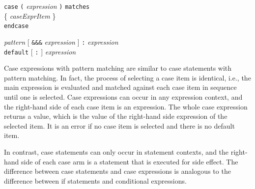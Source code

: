 \documentclass[twoside,letterpaper]{article}
\newcommand{\hm}{\hspace*{1em}}
\newcommand{\hmm}{\hspace*{2em}}
\newcommand{\nterm}[1]{\emph{#1}}
\newcommand{\term}[1]{\texttt{#1}}
\newcommand{\many}[1]{\{ #1 \}}
\newcommand{\opt}[1]{[ #1 ]}
\newcommand{\alt}{{$\mid$}}
\newcommand{\gram}[2]{    \hm\makebox[10em][l]{\it #1}\makebox[1.5em][l]{::=}    #2}
\newcommand{\grammore}[1]{\hm\makebox[10em][l]{      }\makebox[1.5em][l]{}       #1}
\newcommand{\gramalt}[1]{ \hm\makebox[10em][l]{      }\makebox[1.5em][l]{\alt}   #1}
\begin{document}
\label{sec-case-expr}


\gram{caseExpr}{ \term{case} \term{(} \nterm{expression} \term{)} \term{matches} } \\
\grammore      { \hmm \many{ \nterm{caseExprItem} } } \\
\grammore      { \term{endcase} }

\gram{caseExprItem}{ \nterm{pattern}
                      \opt{ \term{\&\&\&} \nterm{expression} }
                      \term{:}
                      \nterm{expression} } \\
\gramalt          { \term{default} \opt{ \term{:} } \nterm{expression} }

Case expressions with pattern matching are similar to case statements
with pattern matching.  In fact, the process of selecting a case item
is identical, i.e., the main expression is evaluated and matched
against each case item in sequence until one is selected.  Case
expressions can occur in any expression context, and the right-hand
side of each case item is an expression.  The whole case expression
returns a value, which is the value of the right-hand side expression
of the selected item.  It is an error if no case item is selected and
there is no default item.

In contrast, case statements can only occur in statement contexts, and
the right-hand side of each case arm is a statement that is executed
for side effect.  The difference between case statements and case
expressions is analogous to the difference between if statements and
conditional expressions.
\end{document}

